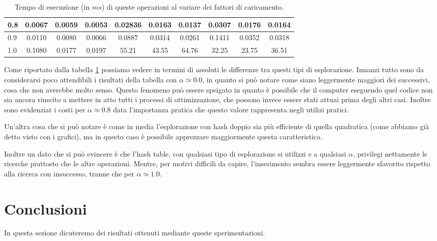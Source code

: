 \documentclass{article}
\begin{document}
\begin{center}
\begin{table}[H]
\begin{tabular}{c|c|c|c||c|c|c||c|c|c|}
\hline
\multicolumn{1}{|l|}{\textbf{0.8}} & 0.0067 & 0.0059 & 0.0053 & 0.02836 & 0.0163 & 0.0137 & 0.0307 & 0.0176 & 0.0164 \\
\hline
\multicolumn{1}{|l|}{0.9} & 0.0110 & 0.0080 & 0.0066 & 0.0887 & 0.0314 & 0.0261 & 0.1411 & 0.0352 & 0.0318 \\
\hline
\multicolumn{1}{|l|}{1.0} & 0.1080 & 0.0177 & 0.0197 & 55.21 & 43.55 & 64.76 & 32.25 & 23.75 & 36.51 \\
\hline
\end{tabular}
\caption{Tempo di esecuzione (in $ms$) di queste operazioni al variare dei fattori di caricamento.}
\label{tab:Confronto_tempi}
\end{table}
\end{center}

Come riportato dalla tabella \ref{tab:Confronto_tempi} possiamo vedere in termini di assoluti le differenze tra questi tipi di esplorazione. Innanzi tutto sono da considerarsi poco attendibili i risultati della tabella con $\alpha \simeq 0.0$, in quanto si può notare come siano leggermente maggiori dei successivi, cosa che non averebbe molto senso. Questo fenomeno può essere speigato in quanto è possibile che il computer eseguendo quel codice non sia ancora riuscito a mettere in atto tutti i processi di ottimizzazione, che possono invece essere stati attuai prima degli altri casi. Inoltre sono evidenziat i costi per $\alpha \simeq 0.8$ data l'importanza pratica che questo valore rappresenta negli utilizi pratici.

Un'altra cosa che si può notare è come in media l'esplorazione con hash doppio sia più efficiente di quella quadratica (come abbiamo già detto visto con i grafici), ma in questo caso è possibile apprezzare maggiormente questa caratteristica.

Inoltre un dato che si può evincere è che l'hash table, con qualsiasi tipo di esplorazione si utilizzi e a qualsiasi $\alpha$, privilegi nettamente le ricerche piuttosto che le altre operazioni. Mentre, per motivi difficili da capire, l'inserimento sembra essere leggermente sfavorito rispetto alla ricerca con insuccesso, tranne che per $\alpha \simeq 1.0$. 
\section{Conclusioni}
In questa sezione dicuteremo dei risultati ottenuti mediante queste sperimentazioni.
\end{document}
